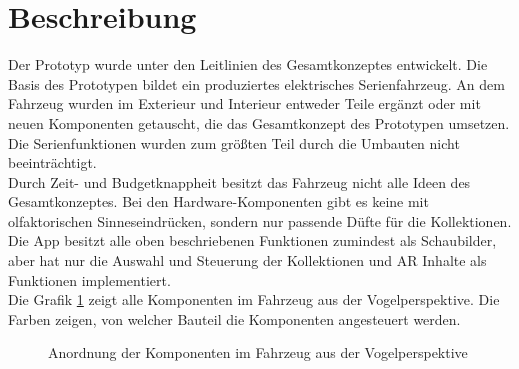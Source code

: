 \section{Beschreibung}
Der Prototyp wurde unter den Leitlinien des Gesamtkonzeptes entwickelt. Die Basis des Prototypen bildet ein produziertes elektrisches Serienfahrzeug. An dem Fahrzeug wurden im Exterieur und Interieur entweder Teile ergänzt oder mit neuen Komponenten getauscht, die das Gesamtkonzept des Prototypen umsetzen. Die Serienfunktionen wurden zum größten Teil durch die Umbauten nicht beeinträchtigt.\\
Durch Zeit- und Budgetknappheit besitzt das Fahrzeug nicht alle Ideen des Gesamtkonzeptes. Bei den Hardware-Komponenten gibt es keine mit olfaktorischen Sinneseindrücken, sondern nur passende Düfte für die Kollektionen. Die App besitzt alle oben beschriebenen Funktionen zumindest als Schaubilder, aber hat nur die Auswahl und Steuerung der Kollektionen und AR Inhalte als Funktionen implementiert. \\
Die Grafik \ref{fig:fahrzeugstruktur} zeigt alle Komponenten im Fahrzeug aus der Vogelperspektive. Die Farben zeigen, von welcher Bauteil die Komponenten angesteuert werden.
\begin{figure}[hbt]
	\centering
	
	\caption[Anordnung der Komponenten im Fahrzeug aus der Vogelperspektive]{Anordnung der Komponenten im Fahrzeug aus der Vogelperspektive}
	\label{fig:fahrzeugstruktur}
\end{figure}
